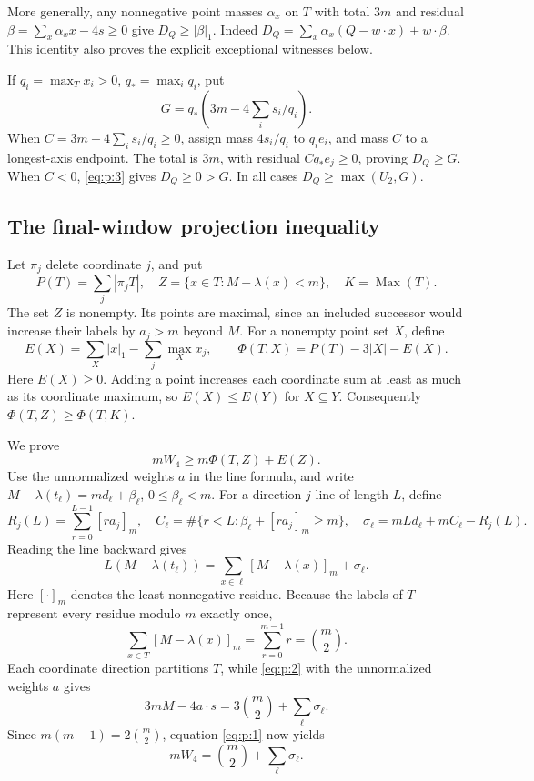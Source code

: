More generally, any nonnegative point masses \(\alpha_x\) on \(T\)
with total \(3m\) and residual
\(\beta=\sum_x\alpha_xx-4s\ge0\) give \(D_Q\ge|\beta|_1\).
Indeed
\(D_Q=\sum_x\alpha_x(Q-w\cdot x)+w\cdot\beta\).
This identity also proves the explicit exceptional witnesses below.

If \(q_i=\max_Tx_i>0\), \(q_*=\max_iq_i\), put
\begin{equation}
G=q_*\left(3m-4\sum_i s_i/q_i\right).
\label{eq:p:5}
\end{equation}
When \(C=3m-4\sum_i s_i/q_i\ge0\), assign mass \(4s_i/q_i\)
to \(q_ie_i\), and mass \(C\) to a longest-axis endpoint.
The total is \(3m\), with residual \(Cq_*e_j\ge0\), proving \(D_Q\ge G\).
When \(C<0\), \eqref{eq:p:3} gives \(D_Q\ge0>G\).
In all cases \(D_Q\ge\max(U_2,G)\).

\subsection{The final-window projection inequality}\label{sec:p3}

Let \(\pi_j\) delete coordinate \(j\), and put
\[
P(T)=\sum_j|\pi_jT|,\quad
Z=\{x\in T:M-\lambda(x)<m\},\quad K=\operatorname{Max}(T).
\]
The set \(Z\) is nonempty. Its points are maximal, since an included
successor would increase their labels by \(a_j>m\) beyond \(M\).
For a nonempty point set \(X\), define
\[
E(X)=\sum_X|x|_1-\sum_j\max_Xx_j,\qquad
\Phi(T,X)=P(T)-3|X|-E(X).
\]
Here \(E(X)\ge0\). Adding a point increases each coordinate sum at least
as much as its coordinate maximum, so \(E(X)\le E(Y)\) for \(X\subseteq Y\).
Consequently \(\Phi(T,Z)\ge\Phi(T,K)\).

We prove
\begin{equation}
\boxed{mW_4\ge m\Phi(T,Z)+E(Z).}
\label{eq:p:6}
\end{equation}
Use the unnormalized weights \(a\) in the line formula, and write
\(M-\lambda(t_\ell)=m d_\ell+\beta_\ell\), \(0\le\beta_\ell<m\).
For a direction-\(j\) line of length \(L\), define
\[
R_j(L)=\sum_{r=0}^{L-1}[ra_j]_m,\quad
C_\ell=\#\{r<L:\beta_\ell+[ra_j]_m\ge m\},\quad
\sigma_\ell=mL d_\ell+mC_\ell-R_j(L).
\]
Reading the line backward gives
\[
L(M-\lambda(t_\ell))
=\sum_{x\in\ell}[M-\lambda(x)]_m+\sigma_\ell.
\]
Here \([\cdot]_m\) denotes the least nonnegative residue. Because the labels
of \(T\) represent every residue modulo \(m\) exactly once,
\[
\sum_{x\in T}[M-\lambda(x)]_m
=\sum_{r=0}^{m-1}r=\binom m2.
\]
Each coordinate direction partitions \(T\), while \eqref{eq:p:2} with the
unnormalized weights \(a\) gives
\[
3mM-4a\cdot s=3\binom m2+\sum_\ell\sigma_\ell.
\]
Since \(m(m-1)=2\binom m2\), equation \eqref{eq:p:1} now yields
\[
mW_4=\binom m2+\sum_\ell\sigma_\ell.
\]

